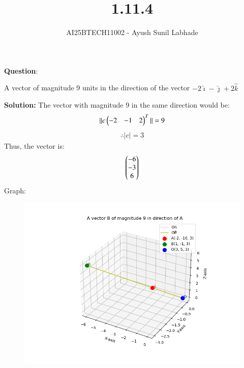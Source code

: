 \documentclass[journal,12pt,onecolumn]{IEEEtran}
\begin{document}
\title{1.11.4}
\author{AI25BTECH11002 - Ayush Sunil Labhade}
{\let\newpage\relax\maketitle}
		\textbf{Question}:\newline

		A vector of magnitude 9 units in the direction of the vector $-2\hat{\imath}-\hat{\jmath}+2\hat{k}$

		\textbf{Solution:}
		The vector with magnitude 9 in the same direction would be: 
		\begin{align}
			\|c\begin{pmatrix}-2 & -1 & 2\end{pmatrix}^T\| = 9
		\end{align}
		\begin{align}
		\therefore |c|=3
		\end{align}
		Thus, the vector is:
		\begin{align}
			\begin{pmatrix}-6 \\ -3\\6\end{pmatrix}
		\end{align}
		Graph:
\begin{figure}[H]
	\centering
	\includegraphics[scale=0.5]{plot}
	\caption*{}
	\label{fig}
\end{figure}
\end{document}
